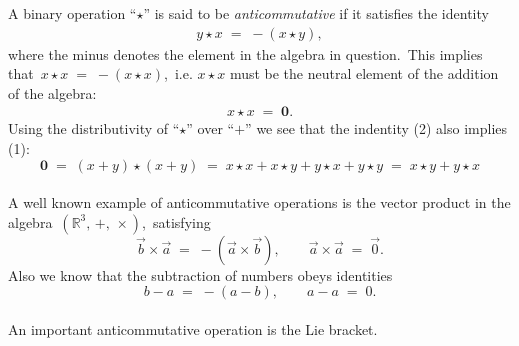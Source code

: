 \documentclass[12pt]{article}
\theoremstyle{definition}
\begin{document}
A binary operation ``$\star$'' is said to be \emph{anticommutative} if it satisfies the identity
\begin{align}
y\!\star\!x \;=\; -(x\!\star\!y),
\end{align}
where the minus denotes the  element in the algebra in question.\, This implies that\, 
$x\!\star\!x \;=\; -(x\!\star\!x)$,\, i.e. $x\!\star\!x$ must be the neutral element of the addition of the algebra:
\begin{align}
x\!\star\!x \;=\; \textbf{0}.
\end{align}
Using the distributivity of ``$\star$'' over ``$+$'' we see that the indentity (2) also implies (1):
$$\textbf{0} \;=\; (x\!+\!y)\!\star\!(x\!+\!y) \;=\; x\!\star\!x+x\!\star\!y+y\!\star\!x+y\!\star\!y
\;=\; x\!\star\!y+y\!\star\!x$$\\

A well known example of anticommutative operations is the vector product in the algebra 
\,$(\mathbb{R}^3,\,+,\,\times)$,\, satisfying
$$\vec{b}\!\times\!\vec{a} \;=\; -(\vec{a}\!\times\!\vec{b}),
\qquad \vec{a}\!\times\!\vec{a} \;=\; \vec{0}.$$
Also we know that the subtraction of numbers obeys  identities
$$b\!-\!a \;=\; -(a\!-\!b), \qquad a\!-\!a \;=\; 0.$$\\
An important anticommutative operation is the Lie bracket.



\end{document}
